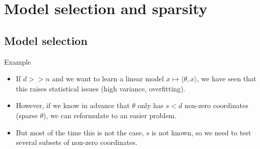 \documentclass[usenames,dvipsnames]{beamer}
\begin{document}
%
%     
%
%
%
%
%
%

\section{Model selection and sparsity}%
\frame{\tableofcontents[currentsection]}
\label{sec:sparsity}

\subsection{Model selection}
\label{sub:model_selection}

\begin{frame}{Example}

    \begin{itemize}
        \item If $d>>n$ and we want to learn a linear model $ x \mapsto \langle \theta, x \rangle$, we have seen that this raises statistical issues (high variance, overfitting).
	\item However, if we know in advance that $ \theta$ only has $s<d$ non-zero coordinates (sparse $ \theta$), we can reformulate to an easier problem.
	\item But most of the time this is not the case, $s$ is not known, so we need to test several subsets of non-zero coordinates.
    \end{itemize}

    
\end{frame}
\end{document}
